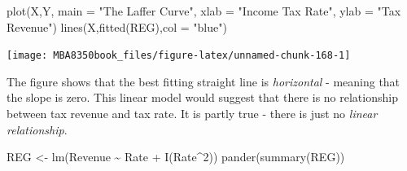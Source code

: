 \documentclass[
]{book}
\newenvironment{Shaded}{\begin{snugshade}}{\end{snugshade}}
\newcommand{\AttributeTok}[1]{\textcolor[rgb]{0.77,0.63,0.00}{#1}}
\newcommand{\DecValTok}[1]{\textcolor[rgb]{0.00,0.00,0.81}{#1}}
\newcommand{\FunctionTok}[1]{\textcolor[rgb]{0.00,0.00,0.00}{#1}}
\newcommand{\NormalTok}[1]{#1}
\newcommand{\OtherTok}[1]{\textcolor[rgb]{0.56,0.35,0.01}{#1}}
\newcommand{\SpecialCharTok}[1]{\textcolor[rgb]{0.00,0.00,0.00}{#1}}
\newcommand{\StringTok}[1]{\textcolor[rgb]{0.31,0.60,0.02}{#1}}
\begin{document}
\begin{Shaded}
\begin{Highlighting}[]
\FunctionTok{plot}\NormalTok{(X,Y,}
     \AttributeTok{main =} \StringTok{"The Laffer Curve"}\NormalTok{,}
     \AttributeTok{xlab =} \StringTok{"Income Tax Rate"}\NormalTok{,}
     \AttributeTok{ylab =} \StringTok{"Tax Revenue"}\NormalTok{)}
\FunctionTok{lines}\NormalTok{(X,}\FunctionTok{fitted}\NormalTok{(REG),}\AttributeTok{col =} \StringTok{"blue"}\NormalTok{)}
\end{Highlighting}
\end{Shaded}

\begin{center}\texttt{[image: MBA8350book\_files/figure-latex/unnamed-chunk-168-1]} \end{center}

The figure shows that the best fitting straight line is \emph{horizontal} - meaning that the slope is zero. This linear model would suggest that there is no relationship between tax revenue and tax rate. It is partly true - there is just no \emph{linear relationship}.

\begin{Shaded}
\begin{Highlighting}[]
\NormalTok{REG }\OtherTok{\textless{}{-}} \FunctionTok{lm}\NormalTok{(Revenue }\SpecialCharTok{\textasciitilde{}}\NormalTok{ Rate }\SpecialCharTok{+} \FunctionTok{I}\NormalTok{(Rate}\SpecialCharTok{\^{}}\DecValTok{2}\NormalTok{))}
\FunctionTok{pander}\NormalTok{(}\FunctionTok{summary}\NormalTok{(REG))}
\end{Highlighting}
\end{Shaded}
\end{document}
